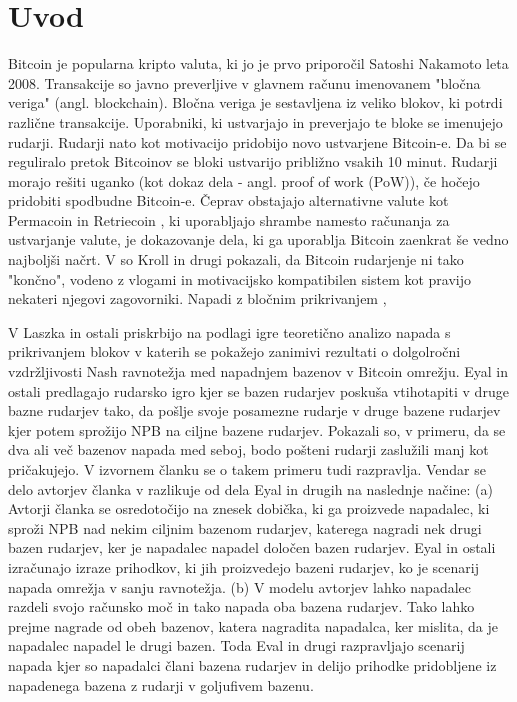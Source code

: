 \documentclass[12pt]{article}
\begin{document}
\section{Uvod}
Bitcoin je popularna kripto valuta, ki jo je prvo priporočil Satoshi Nakamoto \cite{nakamoto} leta 2008. Transakcije so javno preverljive v glavnem računu imenovanem "bločna veriga" (angl. blockchain). Bločna veriga je sestavljena iz veliko blokov, ki potrdi različne transakcije. Uporabniki, ki ustvarjajo in preverjajo te bloke se imenujejo rudarji. Rudarji nato kot motivacijo pridobijo novo ustvarjene Bitcoin-e. Da bi se reguliralo pretok Bitcoinov se bloki ustvarijo približno vsakih 10 minut. Rudarji morajo rešiti uganko (kot dokaz dela - angl. proof of work (PoW)), če hočejo pridobiti spodbudne Bitcoin-e. Čeprav obstajajo alternativne valute kot Permacoin \cite{permacoin} in Retriecoin \cite{retriecoin}, ki uporabljajo shrambe namesto računanja za ustvarjanje valute, je dokazovanje dela, ki ga uporablja Bitcoin zaenkrat še vedno najboljši načrt. V \cite{economicsofbitcoin} so Kroll  in drugi pokazali, da Bitcoin rudarjenje ni tako "končno", vodeno z vlogami in motivacijsko kompatibilen sistem kot pravijo nekateri njegovi zagovorniki. Napadi z bločnim prikrivanjem \cite{analysisofbitcoin},\cite{financialcryptography}


V \cite{financialcryptography} Laszka in ostali priskrbijo na podlagi igre teoretično analizo napada s prikrivanjem blokov v katerih se pokažejo zanimivi rezultati o dolgolročni vzdržljivosti Nash ravnotežja med napadnjem bazenov v Bitcoin omrežju. Eyal in ostali \cite{minnersdilemma} predlagajo rudarsko igro kjer se bazen rudarjev poskuša vtihotapiti v druge bazne rudarjev tako, da pošlje svoje posamezne rudarje v druge bazene rudarjev kjer potem sprožijo NPB na ciljne bazene rudarjev. Pokazali so, v primeru, da se dva ali več bazenov napada med seboj, bodo pošteni rudarji zaslužili manj kot pričakujejo. V izvornem članku se o takem primeru tudi razpravlja. Vendar se delo avtorjev članka v \cite{originalarticle} razlikuje od dela Eyal in drugih \cite{minnersdilemma} na naslednje načine: (a) Avtorji članka se osredotočijo na znesek dobička, ki ga proizvede napadalec, ki sproži NPB nad nekim ciljnim bazenom rudarjev, katerega nagradi nek drugi bazen rudarjev, ker je napadalec napadel določen bazen rudarjev. Eyal in ostali izračunajo izraze prihodkov, ki jih proizvedejo bazeni rudarjev, ko je scenarij napada omrežja v sanju ravnotežja. (b) V modelu avtorjev \cite{originalarticle} lahko napadalec razdeli svojo računsko moč in tako napada oba bazena rudarjev. Tako lahko prejme nagrade od obeh bazenov, katera nagradita napadalca, ker mislita, da je napadalec napadel le drugi bazen. Toda Eval in drugi razpravljajo scenarij napada kjer so napadalci člani bazena rudarjev in delijo prihodke pridobljene iz napadenega bazena z rudarji v goljufivem bazenu.
\end{document}
